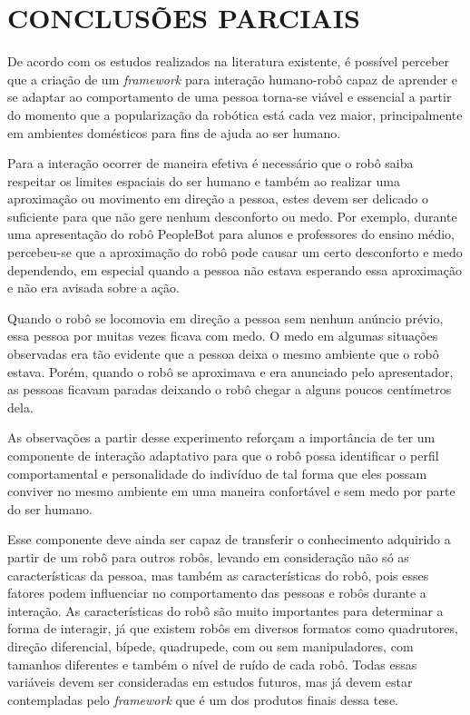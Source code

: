 \chapter{CONCLUSÕES PARCIAIS}
\label{cap:conclusoes}
De acordo com os estudos realizados na literatura existente, é possível perceber que a criação de um \emph{framework} para interação humano-robô capaz de aprender e se adaptar ao comportamento de uma pessoa torna-se viável e essencial a partir do momento que a popularização da robótica está cada vez maior, principalmente em ambientes domésticos para fins de ajuda ao ser humano.

Para a interação ocorrer de maneira efetiva é necessário que o robô saiba respeitar os limites espaciais do ser humano e também ao realizar uma aproximação ou movimento em direção a pessoa, estes devem ser delicado o suficiente para que não gere nenhum desconforto ou medo. Por exemplo, durante uma apresentação do robô PeopleBot para alunos e professores do ensino médio, percebeu-se que a aproximação do robô pode causar um certo desconforto e medo dependendo, em especial quando a pessoa não estava esperando essa aproximação e não era avisada sobre a ação. 

Quando o robô se locomovia em direção a pessoa sem nenhum anúncio prévio, essa pessoa por muitas vezes ficava com medo. O medo em algumas situações observadas era tão evidente que a pessoa deixa o mesmo ambiente que o robô estava. Porém, quando o robô se aproximava e era anunciado pelo apresentador, as pessoas ficavam paradas deixando o robô chegar a alguns poucos centímetros dela. 

As observações a partir desse experimento reforçam a importância de ter um componente de interação adaptativo para que o robô possa identificar o perfil comportamental e personalidade do indivíduo de tal forma que eles possam conviver no mesmo ambiente em uma maneira confortável e sem medo por parte do ser humano.

Esse componente deve ainda ser capaz de transferir o conhecimento adquirido a partir de um robô para outros robôs, levando em consideração não só as características da pessoa, mas também as características do robô, pois esses fatores podem influenciar no comportamento das pessoas e robôs durante a interação. As características do robô são muito importantes para determinar a forma de interagir, já que existem robôs em diversos formatos como quadrutores, direção diferencial, bípede, quadrupede, com ou sem manipuladores, com tamanhos diferentes e também o nível de ruído de cada robô. Todas essas variáveis devem ser consideradas em estudos futuros, mas já devem estar contempladas pelo \emph{framework} que é um dos produtos finais dessa tese.